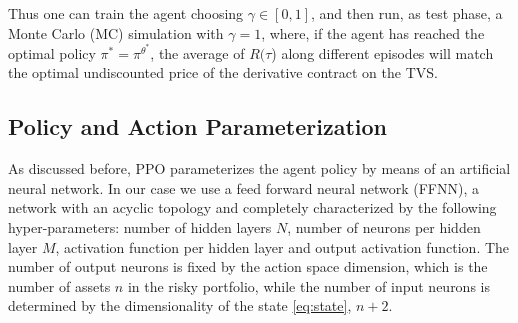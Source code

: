\documentclass[11pt]{article}
\begin{document}
 Thus one can train the agent choosing $\gamma\in[0,1]$, and then run, as test phase, a Monte Carlo (MC) simulation with $\gamma=1$, where, if the agent has reached the optimal policy $\pi^* = \pi^{\theta^*}$, the average of $R(\tau$) along different episodes will match the optimal undiscounted price of the derivative contract on the TVS.  

\subsection{Policy and Action Parameterization}
As discussed before, PPO parameterizes the agent policy by means of an artificial neural network. In our case we use a feed forward neural network (FFNN), a network with an acyclic topology and completely characterized by the following hyper-parameters: number of hidden layers $N$, number of neurons per hidden layer $M$, activation function per hidden layer and output activation function. The number of output neurons is fixed by the action space dimension, which is the number of assets $n$ in the risky portfolio, while the number of  input neurons is determined by the dimensionality of the state \eqref{eq:state}, $n+2$.




\begin{comment}
\section{Numerical Investigation}
Dire qui che abbiamo lavorato con l'implementazione di OpenAi 


The actions of the agent as a function of its observations of the environment are termed the agent policy.  In our case the policy is the asset allocation weights $\alpha$, while the rewards are the costs generated by hedging a derivative contract on the TVS. Once the agent is trained, and the optimal policy is selected, we can run a Monte Carlo simulation to calculate the option price on the TVS. 
 
 We adopt as learning strategy the PPO algoritm developed in \textcite{ppo} and \textcite{gae}. We have 
\end{comment}
\cleardoublepage
\printbibliography
\end{document}
